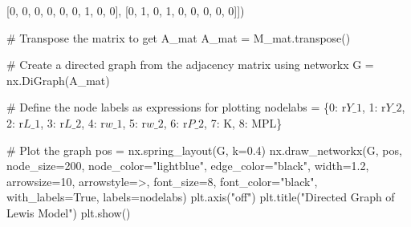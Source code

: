 \documentclass[
  letterpaper,
  DIV=11,
  numbers=noendperiod]{scrreprt}
\newenvironment{Shaded}{\begin{snugshade}}{\end{snugshade}}
\newcommand{\CommentTok}[1]{\textcolor[rgb]{0.37,0.37,0.37}{#1}}
\newcommand{\DecValTok}[1]{\textcolor[rgb]{0.68,0.00,0.00}{#1}}
\newcommand{\FloatTok}[1]{\textcolor[rgb]{0.68,0.00,0.00}{#1}}
\newcommand{\NormalTok}[1]{\textcolor[rgb]{0.00,0.23,0.31}{#1}}
\newcommand{\OperatorTok}[1]{\textcolor[rgb]{0.37,0.37,0.37}{#1}}
\newcommand{\StringTok}[1]{\textcolor[rgb]{0.13,0.47,0.30}{#1}}
\newcommand{\VariableTok}[1]{\textcolor[rgb]{0.07,0.07,0.07}{#1}}
\newcommand{\VerbatimStringTok}[1]{\textcolor[rgb]{0.13,0.47,0.30}{#1}}
\begin{document}
\begin{tcolorbox}
\begin{Shaded}
\begin{Highlighting}[]
\NormalTok{                  [}\DecValTok{0}\NormalTok{, }\DecValTok{0}\NormalTok{, }\DecValTok{0}\NormalTok{, }\DecValTok{0}\NormalTok{, }\DecValTok{0}\NormalTok{, }\DecValTok{0}\NormalTok{, }\DecValTok{1}\NormalTok{, }\DecValTok{0}\NormalTok{, }\DecValTok{0}\NormalTok{],}
\NormalTok{                  [}\DecValTok{0}\NormalTok{, }\DecValTok{1}\NormalTok{, }\DecValTok{0}\NormalTok{, }\DecValTok{1}\NormalTok{, }\DecValTok{0}\NormalTok{, }\DecValTok{0}\NormalTok{, }\DecValTok{0}\NormalTok{, }\DecValTok{0}\NormalTok{, }\DecValTok{0}\NormalTok{]])}

\CommentTok{\# Transpose the matrix to get A\_mat}
\NormalTok{A\_mat }\OperatorTok{=}\NormalTok{ M\_mat.transpose()}

\CommentTok{\# Create a directed graph from the adjacency matrix using networkx}
\NormalTok{G }\OperatorTok{=}\NormalTok{ nx.DiGraph(A\_mat)}

\CommentTok{\# Define the node labels as expressions for plotting}
\NormalTok{nodelabs  }\OperatorTok{=}\NormalTok{ \{}\DecValTok{0}\NormalTok{: }\VerbatimStringTok{r\textquotesingle{}$Y\_1$\textquotesingle{}}\NormalTok{, }\DecValTok{1}\NormalTok{: }\VerbatimStringTok{r\textquotesingle{}$Y\_2$\textquotesingle{}}\NormalTok{, }\DecValTok{2}\NormalTok{: }\VerbatimStringTok{r\textquotesingle{}$L\_1$\textquotesingle{}}\NormalTok{, }\DecValTok{3}\NormalTok{: }\VerbatimStringTok{r\textquotesingle{}$L\_2$\textquotesingle{}}\NormalTok{, }
          \DecValTok{4}\NormalTok{: }\VerbatimStringTok{r\textquotesingle{}$w\_1$\textquotesingle{}}\NormalTok{, }\DecValTok{5}\NormalTok{: }\VerbatimStringTok{r\textquotesingle{}$w\_2$\textquotesingle{}}\NormalTok{, }\DecValTok{6}\NormalTok{: }\VerbatimStringTok{r\textquotesingle{}$P\_2$\textquotesingle{}}\NormalTok{, }\DecValTok{7}\NormalTok{: }\StringTok{\textquotesingle{}K\textquotesingle{}}\NormalTok{, }\DecValTok{8}\NormalTok{: }\StringTok{\textquotesingle{}MPL\textquotesingle{}}\NormalTok{\}}

\CommentTok{\# Plot the graph}
\NormalTok{pos }\OperatorTok{=}\NormalTok{ nx.spring\_layout(G, k}\OperatorTok{=}\FloatTok{0.4}\NormalTok{)}
\NormalTok{nx.draw\_networkx(G, pos, node\_size}\OperatorTok{=}\DecValTok{200}\NormalTok{, node\_color}\OperatorTok{=}\StringTok{"lightblue"}\NormalTok{, }
\NormalTok{                 edge\_color}\OperatorTok{=}\StringTok{"black"}\NormalTok{, width}\OperatorTok{=}\FloatTok{1.2}\NormalTok{, arrowsize}\OperatorTok{=}\DecValTok{10}\NormalTok{, }
\NormalTok{                 arrowstyle}\OperatorTok{=}\StringTok{\textquotesingle{}{-}\textgreater{}\textquotesingle{}}\NormalTok{, font\_size}\OperatorTok{=}\DecValTok{8}\NormalTok{, font\_color}\OperatorTok{=}\StringTok{"black"}\NormalTok{,}
\NormalTok{                 with\_labels}\OperatorTok{=}\VariableTok{True}\NormalTok{, labels}\OperatorTok{=}\NormalTok{nodelabs)}
\NormalTok{plt.axis(}\StringTok{"off"}\NormalTok{)}
\NormalTok{plt.title(}\StringTok{"Directed Graph of Lewis Model"}\NormalTok{)}
\NormalTok{plt.show()}
\end{Highlighting}
\end{Shaded}

\end{tcolorbox}
\end{document}
